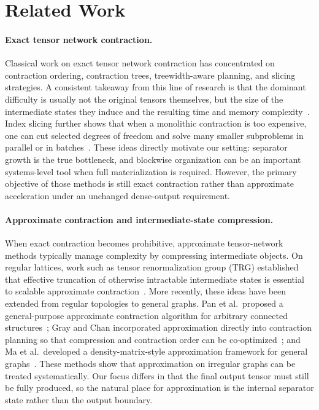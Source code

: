 \section{Related Work}

\paragraph{Exact tensor network contraction.}
Classical work on exact tensor network contraction has concentrated on contraction ordering, contraction trees, treewidth-aware planning, and slicing strategies. A consistent takeaway from this line of research is that the dominant difficulty is usually not the original tensors themselves, but the size of the intermediate states they induce and the resulting time and memory complexity~\cite{markov2008simulating,dumitrescu2018benchmarking,jakes2019carving,gray2021hyperoptimized}. Index slicing further shows that when a monolithic contraction is too expensive, one can cut selected degrees of freedom and solve many smaller subproblems in parallel or in batches~\cite{huang2021efficient}. These ideas directly motivate our setting: separator growth is the true bottleneck, and blockwise organization can be an important systems-level tool when full materialization is required. However, the primary objective of those methods is still exact contraction rather than approximate acceleration under an unchanged dense-output requirement.

\paragraph{Approximate contraction and intermediate-state compression.}
When exact contraction becomes prohibitive, approximate tensor-network methods typically manage complexity by compressing intermediate objects. On regular lattices, work such as tensor renormalization group (TRG) established that effective truncation of otherwise intractable intermediate states is essential to scalable approximate contraction~\cite{levin2007trg}. More recently, these ideas have been extended from regular topologies to general graphs. Pan et al.\ proposed a general-purpose approximate contraction algorithm for arbitrary connected structures~\cite{pan2020contracting}; Gray and Chan incorporated approximation directly into contraction planning so that compression and contraction order can be co-optimized~\cite{gray2024hyperoptimized}; and Ma et al.\ developed a density-matrix-style approximation framework for general graphs~\cite{ma2024approximate}. These methods show that approximation on irregular graphs can be treated systematically. Our focus differs in that the final output tensor must still be fully produced, so the natural place for approximation is the internal separator state rather than the output boundary.

